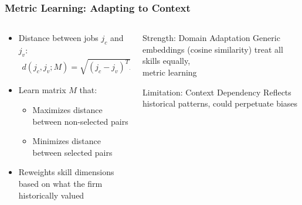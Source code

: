 \documentclass[aspectratio=169]{beamer}
\begin{document}
\begin{frame}
\frametitle{Metric Learning: Adapting to Context}

\begin{columns}
\begin{column}{0.5\textwidth}
\begin{itemize}
\item Distance between jobs $j_c$ and $j_v$:
\begin{align*}
d(j_c, j_v; M) = \sqrt{(j_c - j_v)^T M (j_c - j_v)}
\end{align*}

\item Learn matrix $M$ that:
\begin{itemize}
\item Maximizes distance between non-selected pairs
\item Minimizes distance between selected pairs
\end{itemize}

\item Reweights skill dimensions based on what the firm historically valued
\end{itemize}
\end{column}

\begin{column}{0.5\textwidth}
\begin{block}{Strength: Domain Adaptation}
Generic embeddings (cosine similarity) treat all skills equally,\\
metric learning 
\end{block}

\begin{block}{Limitation: Context Dependency}
Reflects historical patterns, could perpetuate biases
\end{block}
\end{column}
\end{columns}
\end{frame}

\end{document}
